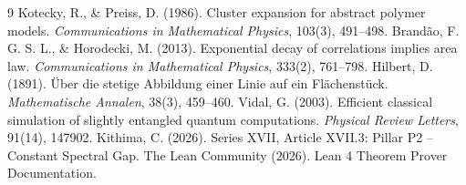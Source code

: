 \documentclass[11pt,a4paper]{article}
\begin{document}

\begin{thebibliography}{9}
  Kotecky, R., \& Preiss, D. (1986). Cluster expansion for abstract polymer models. \emph{Communications in Mathematical Physics}, 103(3), 491–498.
  Brandão, F. G. S. L., \& Horodecki, M. (2013). Exponential decay of correlations implies area law. \emph{Communications in Mathematical Physics}, 333(2), 761–798.
  Hilbert, D. (1891). Über die stetige Abbildung einer Linie auf ein Flächenstück. \emph{Mathematische Annalen}, 38(3), 459–460.
  Vidal, G. (2003). Efficient classical simulation of slightly entangled quantum computations. \emph{Physical Review Letters}, 91(14), 147902.
  Kithima, C. (2026). Series XVII, Article XVII.3: Pillar P2 – Constant Spectral Gap.
  The Lean Community (2026). Lean 4 Theorem Prover Documentation.
\end{thebibliography}
\end{document}
